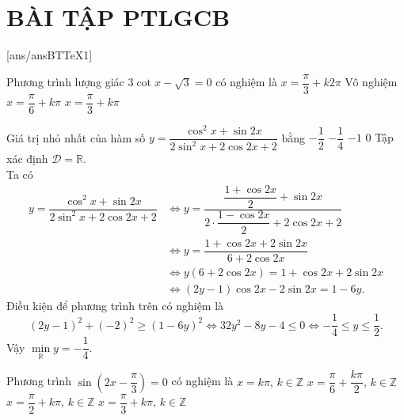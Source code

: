 \section*{BÀI TẬP PTLGCB}
\setcounter{ex}{0}\setcounter{bt}{0}
[ans/ansBTTeX1]

\begin{ex}%
Phương trình lượng giác $3\cot x-\sqrt{3}=0$ có nghiệm là
\choice
{$x=\dfrac{\pi}{3}+k2\pi$}
{Vô nghiệm}
{$x=\dfrac{\pi}{6}+k\pi$}
{\True $x=\dfrac{\pi}{3}+k\pi$}
\end{ex}


\begin{ex}%
Giá trị nhỏ nhất của hàm số $y = \dfrac{\cos^2x + \sin2x}{2\sin^2x + 2\cos2x+2}$ bằng
\choice
{$-\dfrac{1}{2}$}
{\True $-\dfrac{1}{4}$}
{$-1$}
{$0$}
\loigiai
{
Tập xác định $\mathscr{D}=\mathbb{R}$. \\
Ta có
\[\begin{aligned}
y = \dfrac{\cos^2x + \sin2x}{2\sin^2x + 2\cos2x+2}&\Leftrightarrow y=\dfrac{\dfrac{1+\cos2x}{2} + \sin 2x}{2\cdot\dfrac{1-\cos2x}{2} + 2\cos 2x+2} \\
&\Leftrightarrow y = \dfrac{1+\cos2x + 2\sin 2x}{6 + 2\cos2x}\\
&\Leftrightarrow y\left(6 + 2\cos2x\right) = 1 + \cos 2x + 2\sin 2x\\
&\Leftrightarrow (2y - 1)\cos 2x - 2\sin 2x = 1-6y.
\end{aligned}\]
Điều kiện để phương trình trên có nghiệm là
\[(2y - 1)^2 + (-2)^2\ge (1-6y)^2 \Leftrightarrow 32y^2 - 8y - 4 \le 0 \Leftrightarrow -\dfrac{1}{4}\le y\le \dfrac{1}{2}.\]
Vậy $\min\limits_{\mathbb{R}} y=-\dfrac{1}{4}$.
}
\end{ex}

\begin{ex}%
Phương trình $\sin\left(2x-\dfrac{\pi}{3}\right)=0$ có nghiệm là
\choice
{$x=k\pi ,\,k\in\mathbb{Z}$}
{\True $x=\dfrac{\pi}{6}+\dfrac{k\pi}{2},\,k\in\mathbb{Z}$}
{$x=\dfrac{\pi}{2}+k\pi ,\,k\in\mathbb{Z}$}
{$x=\dfrac{\pi}{3}+k\pi ,\,k\in\mathbb{Z}$}
\end{ex}

